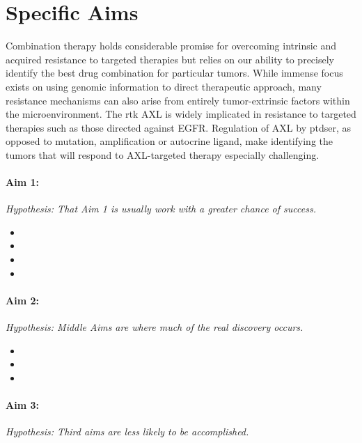 
\section{Specific Aims}

Combination therapy holds considerable promise for overcoming intrinsic and acquired resistance to targeted therapies but relies on our ability to precisely identify the best drug combination for particular tumors. While immense focus exists on using genomic information to direct therapeutic approach, many resistance mechanisms can also arise from entirely tumor-extrinsic factors within the microenvironment. The \gls{rtk} AXL is widely implicated in resistance to targeted therapies such as those directed against EGFR. Regulation of AXL by \gls{ptdser}, as opposed to mutation, amplification or autocrine ligand, make identifying the tumors that will respond to AXL-targeted therapy especially challenging\cite{Rachez2000}.

\paragraph*{Aim 1: \SpecificAimOne} \emph{Hypothesis: That Aim 1 is usually work with a greater chance of success.}

\begin{itemize}[noitemsep]
	\item \SpecificAimOneA
	\item \SpecificAimOneB
	\item \SpecificAimOneC
	\item \SpecificAimOneD
\end{itemize}

\paragraph*{Aim 2: \SpecificAimTwo} \emph{Hypothesis: Middle Aims are where much of the real discovery occurs.}

\begin{itemize}[noitemsep]
	\item \SpecificAimTwoA
	\item \SpecificAimTwoB
	\item \SpecificAimTwoC
\end{itemize}

\paragraph*{Aim 3: \SpecificAimThree} \emph{Hypothesis: Third aims are less likely to be accomplished.}

